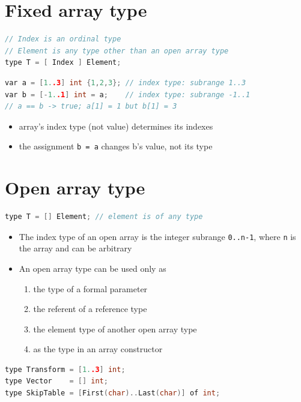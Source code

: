 \documentclass[10pt,a4paper,landscape]{article}
\begin{document}
\begin{multicols*}{3}
\section*{Fixed array type}
\begin{lstlisting}[language=c]
// Index is an ordinal type
// Element is any type other than an open array type
type T = [ Index ] Element;
\end{lstlisting}
\begin{lstlisting}[language=c]
var a = [1..3] int {1,2,3}; // index type: subrange 1..3
var b = [-1..1] int = a;    // index type: subrange -1..1
// a == b -> true; a[1] = 1 but b[1] = 3
\end{lstlisting}
\begin{itemize}
\item array's index type (not value) determines its indexes
\item the assignment \texttt{b = a} changes b's value, not its type
\end{itemize}
\section*{Open array type}
\begin{lstlisting}[language=c]
type T = [] Element; // element is of any type
\end{lstlisting}
\begin{itemize}
\item The index type of an open array is the integer subrange \texttt{0..n-1}, where \texttt{n} is the array  and can be arbitrary
\item An open array type can be used only as
  \begin{enumerate}
  \item the type of a formal parameter
  \item the referent of a reference type
  \item the element type of another open array type
  \item as the type in an array constructor
  \end{enumerate}
\end{itemize}
\begin{lstlisting}[language=c]
type Transform = [1..3] int;
type Vector    = [] int;
type SkipTable = [First(char)..Last(char)] of int;
\end{lstlisting}


\end{multicols*}
\end{document}
